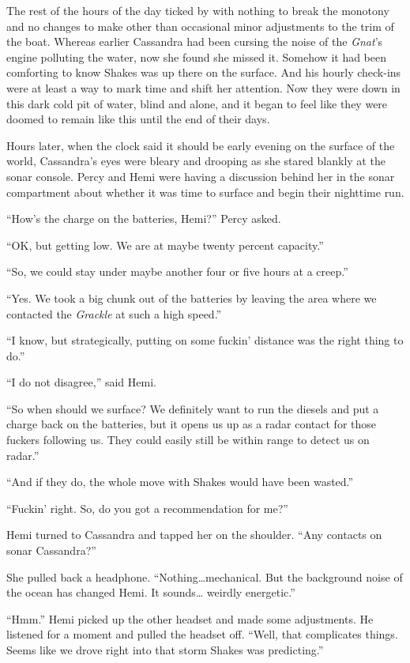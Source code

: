 \documentclass[
]{scrbook}
\begin{document}
The rest of the hours of the day ticked by with nothing to break the
monotony and no changes to make other than occasional minor adjustments
to the trim of the boat. Whereas earlier Cassandra had been cursing the
noise of the \emph{Gnat}'s engine polluting the water, now she found she
missed it. Somehow it had been comforting to know Shakes was up there on
the surface. And his hourly check-ins were at least a way to mark time
and shift her attention. Now they were down in this dark cold pit of
water, blind and alone, and it began to feel like they were doomed to
remain like this until the end of their days.

\bigskip

Hours later, when the clock said it should be early evening on the
surface of the world, Cassandra's eyes were bleary and drooping as she
stared blankly at the sonar console. Percy and Hemi were having a
discussion behind her in the sonar compartment about whether it was time
to surface and begin their nighttime run.

``How's the charge on the batteries, Hemi?'' Percy asked.

``OK, but getting low. We are at maybe twenty percent capacity.''

``So, we could stay under maybe another four or five hours at a creep.''

``Yes. We took a big chunk out of the batteries by leaving the area
where we contacted the \emph{Grackle} at such a high speed.''

``I know, but strategically, putting on some fuckin' distance was the
right thing to do.''

``I do not disagree,'' said Hemi.

``So when should we surface? We definitely want to run the diesels and
put a charge back on the batteries, but it opens us up as a radar
contact for those fuckers following us. They could easily still be
within range to detect us on radar.''

``And if they do, the whole move with Shakes would have been wasted.''

``Fuckin' right. So, do you got a recommendation for me?''

Hemi turned to Cassandra and tapped her on the shoulder. ``Any contacts
on sonar Cassandra?''

She pulled back a headphone. ``Nothing\ldots mechanical. But the
background noise of the ocean has changed Hemi. It sounds\ldots{}
weirdly energetic.''

``Hmm.'' Hemi picked up the other headset and made some adjustments. He
listened for a moment and pulled the headset off. ``Well, that
complicates things. Seems like we drove right into that storm Shakes was
predicting.''
\end{document}

